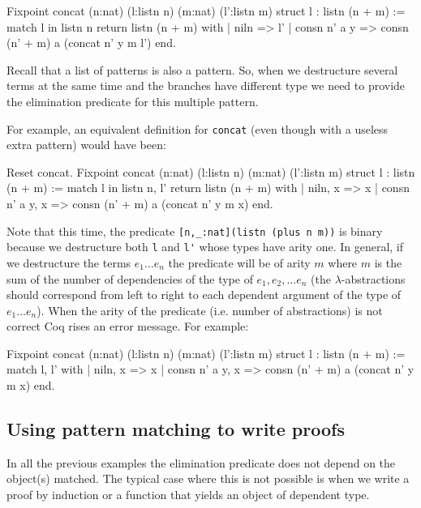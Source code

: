 \begin{coq_example}
Fixpoint concat (n:nat) (l:listn n) (m:nat) (l':listn m) {struct l} :
 listn (n + m) :=
  match l in listn n return listn (n + m) with
  | niln => l'
  | consn n' a y => consn (n' + m) a (concat n' y m l')
  end.
\end{coq_example}

Recall that a list of patterns is also a pattern. So, when
we destructure several terms at the same time and the branches have
different type  we need to provide
the elimination predicate for this multiple pattern.

For example, an equivalent definition for \verb+concat+ (even though with a useless extra pattern) would have
been:

\begin{coq_example}
Reset concat.
Fixpoint concat (n:nat) (l:listn n) (m:nat) (l':listn m) {struct l} :
 listn (n + m) :=
  match l in listn n, l' return listn (n + m) with
  | niln, x => x
  | consn n' a y, x => consn (n' + m) a (concat n' y m x)
  end.
\end{coq_example}

Note that this time, the predicate \verb+[n,_:nat](listn (plus n m))+ is binary because we
destructure both \verb+l+ and \verb+l'+ whose types have arity one.
In general, if we destructure the terms $e_1\ldots e_n$
the predicate will be of arity $m$ where $m$ is the sum of the
number of dependencies of the type of $e_1, e_2,\ldots e_n$ (the $\lambda$-abstractions
should correspond from left to right to each dependent argument of the
type of $e_1\ldots e_n$).
When the arity of the predicate (i.e. number of abstractions) is not
correct Coq rises an error message. For example:

\begin{coq_example}
Fixpoint concat (n:nat) (l:listn n) (m:nat) (l':listn m) {struct l} :
 listn (n + m) :=
  match l, l' with
  | niln, x => x
  | consn n' a y, x => consn (n' + m) a (concat n' y m x)
  end.
\end{coq_example}


\subsection{Using pattern matching to write proofs}
In all the previous examples the  elimination predicate  does not depend on the object(s) matched. 
The typical case where this is not possible is when we write a proof by
induction or a function that yields an object of dependent type.

